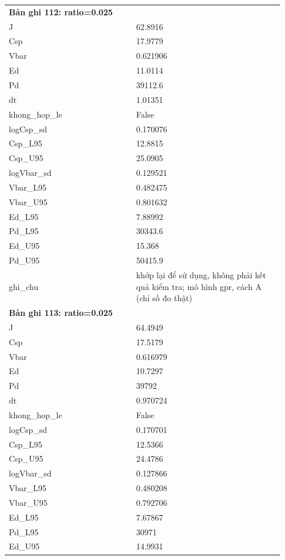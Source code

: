 \begin{longtable}{p{0.43\linewidth}p{0.50\linewidth}}
\midrule
\multicolumn{2}{p{0.95\linewidth}}{\textbf{Bản ghi 112: ratio=0.025}} \\
J & 62.8916 \\
Csp & 17.9779 \\
Vbar & 0.621906 \\
Ed & 11.0114 \\
Pd & 39112.6 \\
dt & 1.01351 \\
khong\_\allowbreak hop\_\allowbreak le & False \\
logCsp\_\allowbreak sd & 0.170076 \\
Csp\_\allowbreak L95 & 12.8815 \\
Csp\_\allowbreak U95 & 25.0905 \\
logVbar\_\allowbreak sd & 0.129521 \\
Vbar\_\allowbreak L95 & 0.482475 \\
Vbar\_\allowbreak U95 & 0.801632 \\
Ed\_\allowbreak L95 & 7.88992 \\
Pd\_\allowbreak L95 & 30343.6 \\
Ed\_\allowbreak U95 & 15.368 \\
Pd\_\allowbreak U95 & 50415.9 \\
ghi\_\allowbreak chu & khớp lại để sử dụng, không phải kết quả kiểm tra; mô hình gpr, cách A (chỉ số đo thật) \\
\midrule
\multicolumn{2}{p{0.95\linewidth}}{\textbf{Bản ghi 113: ratio=0.025}} \\
J & 64.4949 \\
Csp & 17.5179 \\
Vbar & 0.616979 \\
Ed & 10.7297 \\
Pd & 39792 \\
dt & 0.970724 \\
khong\_\allowbreak hop\_\allowbreak le & False \\
logCsp\_\allowbreak sd & 0.170701 \\
Csp\_\allowbreak L95 & 12.5366 \\
Csp\_\allowbreak U95 & 24.4786 \\
logVbar\_\allowbreak sd & 0.127866 \\
Vbar\_\allowbreak L95 & 0.480208 \\
Vbar\_\allowbreak U95 & 0.792706 \\
Ed\_\allowbreak L95 & 7.67867 \\
Pd\_\allowbreak L95 & 30971 \\
Ed\_\allowbreak U95 & 14.9931 \\

\end{longtable}
